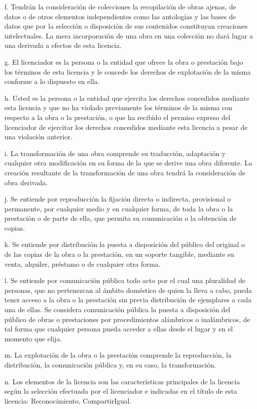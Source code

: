 \documentclass[11pt]{article}
\begin{document}
{{f. Tendrán la consideración de colecciones la recopilación de obras ajenas, de datos o de otros elementos independientes como las antologías y las bases de datos que por la selección o disposición de sus contenidos constituyan creaciones intelectuales. La mera incorporación de una obra en una colección no dará lugar a una derivada a efectos de esta licencia. 

g. El licenciador es la persona o la entidad que ofrece la obra o prestación bajo los términos de esta licencia y le concede los derechos de explotación de la misma conforme a lo dispuesto en ella. 

h. Usted es la persona o la entidad que ejercita los derechos concedidos mediante esta licencia y que no ha violado previamente los términos de la misma con respecto a la obra o la prestación, o que ha recibido el permiso expreso del licenciador de ejercitar los derechos concedidos mediante esta licencia a pesar de una violación anterior. 

i. La transformación de una obra comprende su traducción, adaptación y cualquier otra modificación en su forma de la que se derive una obra diferente. La creación resultante de la transformación de una obra tendrá la consideración de obra derivada. 

j. Se entiende por reproducción la fijación directa o indirecta, provisional o permanente, por cualquier medio y en cualquier forma, de toda la obra o la prestación o de parte de ella, que permita su comunicación o la obtención de copias. 

k. Se entiende por distribución la puesta a disposición del público del original o de las copias de la obra o la prestación, en un soporte tangible, mediante su venta, alquiler, préstamo o de cualquier otra forma. 

l. Se entiende por comunicación pública todo acto por el cual una pluralidad de personas, que no pertenezcan al ámbito doméstico de quien la lleva a cabo, pueda tener acceso a la obra o la prestación sin previa distribución de ejemplares a cada una de ellas. Se considera comunicación pública la puesta a disposición del público de obras o prestaciones por procedimientos alámbricos o inalámbricos, de tal forma que cualquier persona pueda acceder a ellas desde el lugar y en el momento que elija. 

m. La explotación de la obra o la prestación comprende la reproducción, la distribución, la comunicación pública y, en su caso, la transformación. 

n. Los elementos de la licencia son las características principales de la licencia según la selección efectuada por el licenciador e indicadas en el título de esta licencia: Reconocimiento, CompartirIgual. 

}}
\end{document}
